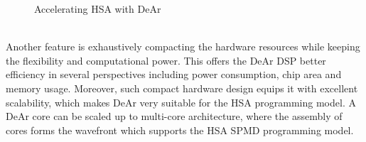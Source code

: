 \begin{figure}[!ht]
    \begin{center}
        \hfill
    \end{center}
    \caption{Accelerating HSA with DeAr}
    \label{fig:bb}
\end{figure}
\\\indent 
Another feature is exhaustively compacting the hardware resources while keeping the flexibility and computational power.
This offers the DeAr DSP better efficiency in several perspectives including power consumption, chip area and memory usage.
Moreover, such compact hardware design equips it with excellent scalability, 
which makes DeAr very suitable for the HSA programming model.
A DeAr core can be scaled up to multi-core architecture, 
where the assembly of cores forms the wavefront which supports the HSA SPMD programming model.

